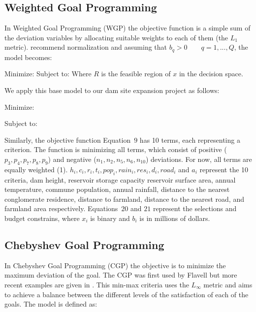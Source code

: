 \subsection{Weighted Goal Programming}
In Weighted Goal Programming (WGP) the objective function is a simple sum of the deviation variables by allocating suitable weights to each of them (the $L_1 $ metric). \cite{jones2010} recommend normalization and assuming that $b_q > 0 \qquad q = 1, ..., Q$, the model becomes:

Minimize:
            \EqWGPMinFunctionFive
Subject to:
            \EqGGPMinFunctionSubTwo
            \EqGGPMinFunctionSubThree
            \EqGGPMinFunctionSubFour
Where $R$ is the feasible region of $x$ in the decision space.

We apply this base model to our dam site expansion project as follows:

Minimize:
        \EqDamWGPObjectiveEleven

Subject to:
        \EqDamHeightConstraintTwelve
        \EqDamCapacityConstraintThirteen
        \EqReservoirAreaConstraintFourteen
        \EqTemperatureConstraintFifteen
        \EqPopulationConstraintSixteen
        \EqRainfallConstraintSeventeen
        \EqResidenceConstraintEighteen
        \EqFarmlandDistanceConstraintNineteen
        \EqNearestRoadConstraintTwenty
        \EqFarmlandAreaConstraintTwentyOne
        \EqSelectThreeDamsTwentyTwo
        \EqBudgetConstraintTwentyThree

Similarly, the objective function Equation~$9$ has 10 terms, each representing a criterion. The function is minimizing all terms, which consist of positive ($p_3, p_4, p_7, p_8, p_9$) and negative ($n_1, n_2, n_5, n_6, n_10$) deviations. For now, all terms are equally weighted (1). $h_i, c_i, r_i, t_i, pop_i, rain_i, res_i, d_i, road_i$ and $a_i$ represent the 10 criteria, dam height, reservoir storage capacity reservoir surface area,  annual temperature,   commune population, annual rainfall, distance to the nearest conglomerate residence, distance to farmland, distance to the nearest road, and farmland area respectively. Equations~$20$ and $21$
represent the selections and budget constrains, where $x_i$ is binary and  $b_i$ is in millions of dollars.

\subsection{Chebyshev Goal Programming}
In Chebyshev Goal Programming (CGP) the objective is to minimize the maximum deviation of the goal. The CGP was first used by Flavell\cite{FLAVELL1976} but more recent examples are given in \cite{Despotis2008,HO2019}. This min-max criteria uses the $L_\infty$ metric and aims to achieve a balance between the different levels of the satisfaction of each of the goals. The model is defined as:

